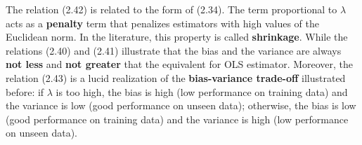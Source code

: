 \documentclass{report}
\begin{document}
The relation (2.42) is related to the form of (2.34). The term proportional to $\lambda$ acts as a \textbf{penalty} term that penalizes estimators with high values of the Euclidean norm. In the literature, this property is called \textbf{shrinkage}. While the relations (2.40) and (2.41) illustrate that the bias and the variance are always \textbf{not less} and \textbf{not greater} that the equivalent for OLS estimator. Moreover, the relation (2.43) is a lucid realization of the \textbf{bias-variance trade-off} illustrated before: if $\lambda$ is too high, the bias is high (low performance on training data) and the variance is low (good performance on unseen data); otherwise, the bias is low (good performance on training data) and the variance is high (low performance on unseen data).
\end{document}
